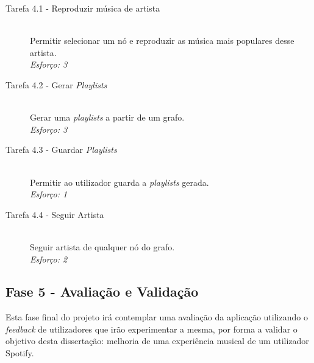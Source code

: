    \begin{description}
      \item[Tarefa 4.1 - Reproduzir música de artista] \hfill \\
      Permitir selecionar um nó e reproduzir as música mais populares desse artista. \\
      \emph{Esforço: 3}

      \item[Tarefa 4.2 - Gerar \emph{Playlists}] \hfill \\
      Gerar uma \emph{playlists} a partir de um grafo. \\
      \emph{Esforço: 3}

      \item[Tarefa 4.3 - Guardar \emph{Playlists}] \hfill \\
      Permitir ao utilizador guarda a \emph{playlists} gerada. \\
      \emph{Esforço: 1}

      \item[Tarefa 4.4 - Seguir Artista] \hfill \\
      Seguir artista de qualquer nó do grafo. \\
      \emph{Esforço: 2}

    \end{description}


  \subsection{Fase 5 - Avaliação e Validação} %
  \label{sub:dev_validacao}
  
    Esta fase final do projeto irá contemplar uma avaliação da aplicação utilizando o \emph{feedback} de utilizadores que irão experimentar a mesma, por forma a validar o objetivo desta dissertação: melhoria de uma experiência musical de um utilizador Spotify.

